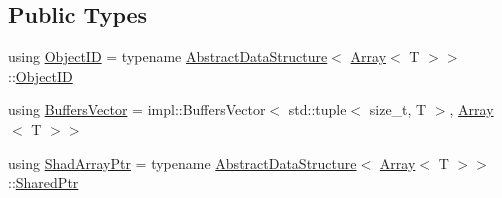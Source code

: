 \subsection*{Public Types}
\begin{DoxyCompactItemize}
\item 
using \hyperlink{classshad_1_1Array_a69c0b0424c09d4779081e358548a3165}{Object\-I\-D} = typename \hyperlink{classshad_1_1AbstractDataStructure}{Abstract\-Data\-Structure}$<$ \hyperlink{classshad_1_1Array}{Array}$<$ T $>$$>$\-::\hyperlink{classshad_1_1Array_a69c0b0424c09d4779081e358548a3165}{Object\-I\-D}
\item 
using \hyperlink{classshad_1_1Array_a9d0f8fb34a90f8b9d232aa086ff75d2a}{Buffers\-Vector} = impl\-::\-Buffers\-Vector$<$ std\-::tuple$<$ size\-\_\-t, T $>$, \hyperlink{classshad_1_1Array}{Array}$<$ T $>$$>$
\item 
using \hyperlink{classshad_1_1Array_a5ff91c72815df47db60fc6ed44b01d46}{Shad\-Array\-Ptr} = typename \hyperlink{classshad_1_1AbstractDataStructure}{Abstract\-Data\-Structure}$<$ \hyperlink{classshad_1_1Array}{Array}$<$ T $>$$>$\-::\hyperlink{classshad_1_1AbstractDataStructure_a8bb29450966955c546d40421ce46316f}{Shared\-Ptr}
\end{DoxyCompactItemize}
